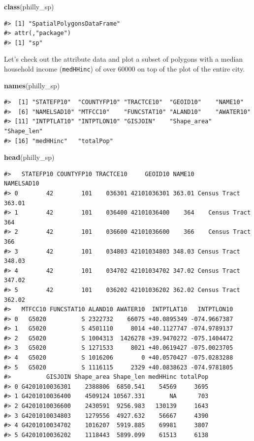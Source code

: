 \documentclass[]{book}
\newenvironment{Shaded}{\begin{snugshade}}{\end{snugshade}}
\newcommand{\KeywordTok}[1]{\textcolor[rgb]{0.13,0.29,0.53}{\textbf{#1}}}
\newcommand{\NormalTok}[1]{#1}
\theoremstyle{definition}
\theoremstyle{definition}
\theoremstyle{definition}
\theoremstyle{remark}
\begin{document}
\begin{Shaded}
\begin{Highlighting}[]
\KeywordTok{class}\NormalTok{(philly_sp)}
\end{Highlighting}
\end{Shaded}

\begin{verbatim}
#> [1] "SpatialPolygonsDataFrame"
#> attr(,"package")
#> [1] "sp"
\end{verbatim}

Let's check out the attribute data and plot a subset of polygons with a
median household income (\texttt{medHHinc}) of over 60000 on top of the
plot of the entire city.

\begin{Shaded}
\begin{Highlighting}[]
\KeywordTok{names}\NormalTok{(philly_sp)}
\end{Highlighting}
\end{Shaded}

\begin{verbatim}
#>  [1] "STATEFP10"  "COUNTYFP10" "TRACTCE10"  "GEOID10"    "NAME10"    
#>  [6] "NAMELSAD10" "MTFCC10"    "FUNCSTAT10" "ALAND10"    "AWATER10"  
#> [11] "INTPTLAT10" "INTPTLON10" "GISJOIN"    "Shape_area" "Shape_len" 
#> [16] "medHHinc"   "totalPop"
\end{verbatim}

\begin{Shaded}
\begin{Highlighting}[]
\KeywordTok{head}\NormalTok{(philly_sp)}
\end{Highlighting}
\end{Shaded}

\begin{verbatim}
#>   STATEFP10 COUNTYFP10 TRACTCE10     GEOID10 NAME10          NAMELSAD10
#> 0        42        101    036301 42101036301 363.01 Census Tract 363.01
#> 1        42        101    036400 42101036400    364    Census Tract 364
#> 2        42        101    036600 42101036600    366    Census Tract 366
#> 3        42        101    034803 42101034803 348.03 Census Tract 348.03
#> 4        42        101    034702 42101034702 347.02 Census Tract 347.02
#> 5        42        101    036202 42101036202 362.02 Census Tract 362.02
#>   MTFCC10 FUNCSTAT10 ALAND10 AWATER10  INTPTLAT10   INTPTLON10
#> 0   G5020          S 2322732    66075 +40.0895349 -074.9667387
#> 1   G5020          S 4501110     8014 +40.1127747 -074.9789137
#> 2   G5020          S 1004313  1426278 +39.9470272 -075.1404472
#> 3   G5020          S 1271533     8021 +40.0619427 -075.0023705
#> 4   G5020          S 1016206        0 +40.0570427 -075.0283288
#> 5   G5020          S 1116115     2329 +40.0838623 -074.9781805
#>          GISJOIN Shape_area Shape_len medHHinc totalPop
#> 0 G4201010036301    2388806  6850.541    54569     3695
#> 1 G4201010036400    4509124 10567.331       NA      703
#> 2 G4201010036600    2430591  9256.983   130139     1643
#> 3 G4201010034803    1279556  4927.632    56667     4390
#> 4 G4201010034702    1016207  5919.885    69981     3807
#> 5 G4201010036202    1118443  5899.099    61513     6138
\end{verbatim}
\end{document}
